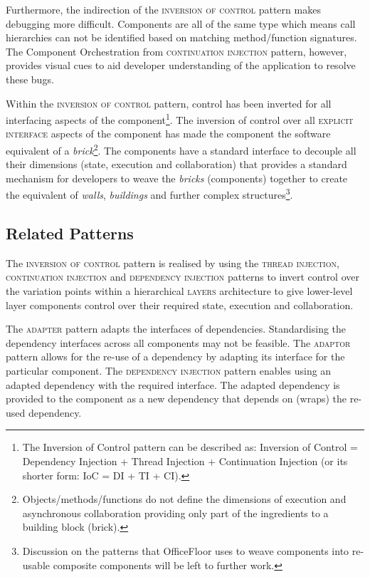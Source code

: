 \documentclass[prodmode]{style/acmlarge}
\begin{document}
Furthermore, the indirection of the \textsc{inversion of control} pattern makes
debugging more difficult.  Components are all of the same type which means call
hierarchies can not be identified based on matching method/function signatures.
The Component Orchestration from \textsc{continuation injection} pattern,
however, provides visual cues to aid developer understanding of the application
to resolve these bugs.

Within the \textsc{inversion of control} pattern, control has been inverted for
all interfacing aspects of the component\footnote{The Inversion of Control
pattern can be described as: Inversion of Control = Dependency Injection +
Thread Injection + Continuation Injection (or its shorter form: IoC = DI + TI +
CI).}.  The inversion of control over all \textsc{explicit interface} aspects of
the component has made the component the software equivalent of a
\textit{brick}\footnote{Objects/methods/functions do not define the dimensions
of execution and asynchronous collaboration providing only part of the
ingredients to a building block (brick).}.  The components have a standard
interface to decouple all their dimensions (state, execution and collaboration)
that provides a standard mechanism for developers to weave the \textit{bricks}
(components) together to create the equivalent of \textit{walls},
\textit{buildings} and further complex structures\footnote{Discussion on the
patterns that OfficeFloor \cite{officefloor} uses to weave components into
re-usable composite components will be left to further work.}.


\subsection{Related Patterns}

The \textsc{inversion of control} pattern is realised by using the
\textsc{thread injection}, \textsc{continuation injection} and
\textsc{dependency injection} patterns to invert control over the variation
points within a hierarchical \textsc{layers} architecture to give lower-level
layer components control over their required state, execution and collaboration.

The \textsc{adapter} pattern \cite{gof} adapts the interfaces of dependencies.
Standardising the dependency interfaces across all components may not be
feasible.  The \textsc{adaptor} pattern allows for the re-use of a dependency by
adapting its interface for the particular component.  The \textsc{dependency
injection} pattern enables using an adapted dependency with the required
interface.  The adapted dependency is provided to the component as a new
dependency that depends on (wraps) the re-used dependency.
\end{document}
